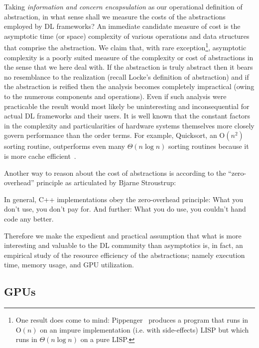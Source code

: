 Taking \textit{information and concern encapsulation} as our operational definition of abstraction, in what sense shall we measure the costs of the abstractions employed by DL frameworks?
An immediate candidate measure of cost is the asymptotic time (or space) complexity of various operations and data structures that comprise the abstraction.
We claim that, with rare exception\footnote{One result does come to mind: Pippenger~\cite{10.1145/244795.244798} produces a program that runs in O$(n)$ on an impure implementation (i.e. with side-effects) LISP but which runs in $\Theta(n \log n)$ on a pure LISP\@.}, asymptotic complexity is a poorly suited measure of the complexity or cost of abstractions in the sense that we here deal with.
If the abstraction is truly abstract then it bears no resemblance to the realization (recall Locke's definition of abstraction) and if the abstraction is reified then the analysis becomes completely impractical (owing to the numerous components and operations).
Even if such analysis were practicable the result would most likely be uninteresting and inconsequential for actual DL frameworks and their users.
It is well known that the constant factors in the complexity and particularities of hardware systems themselves more closely govern performance than the order terms.
For example, Quicksort, an O$\left(n^2\right)$ sorting routine, outperforms even many $\Theta(n\log n)$ sorting routines because it is more cache efficient~\cite{10.5555/1410219}.

Another way to reason about the cost of abstractions is according to the ``zero-overhead'' principle as articulated by Bjarne Stroustrup:
\begin{displayquote}[\cite{10.1007/978-3-642-28869-2_1}]
    In general, C++ implementations obey the zero-overhead principle: What you don't use, you don't pay for.
    And further: What you do use, you couldn't hand code any better.
\end{displayquote}
Therefore we make the expedient and practical assumption that what is more interesting and valuable to the DL community than asymptotics is, in fact, an empirical study of the resource efficiency of the abstractions;
namely execution time, memory usage, and GPU utilization.



\subsection{GPUs}\label{subsec:gpus}

